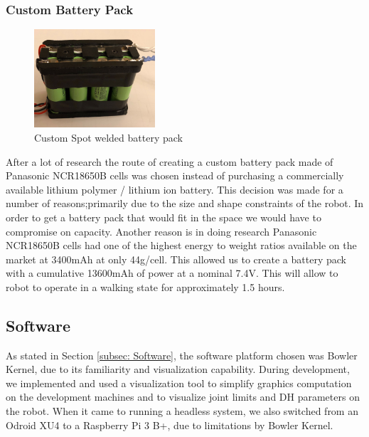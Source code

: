 \subsubsection{Custom Battery Pack}
\begin{figure}[H]
       \centering
       \includegraphics[width=0.4\textwidth]{figures/CustomBatteryPack.jpg}
       \caption{Custom Spot welded battery pack}
       \label{fig:CustomBatteryPack}
   \end{figure}
   After a lot of research the route of creating a custom battery pack made of Panasonic NCR18650B cells was chosen instead of purchasing a commercially available lithium polymer / lithium ion battery. This decision was made for a number of reasons;primarily due to the size and shape constraints of the robot. In order to get a battery pack that would fit in the space we would have to compromise on capacity. Another reason is in doing research Panasonic NCR18650B cells had one of the highest energy to weight ratios available on the market at 3400mAh at only 44g/cell. This allowed us to create a battery pack with a cumulative 13600mAh of power at a nominal 7.4V. This will allow to robot to operate in a walking state for approximately 1.5 hours.

\subsection{Software}
    As stated in Section \ref{subsec: Software}, the software platform chosen was Bowler Kernel, due to its familiarity and visualization capability. During development, we implemented and used a visualization tool to simplify graphics computation on the development machines and to visualize joint limits and DH parameters on the robot. When it came to running a headless system, we also switched from an Odroid XU4 to a Raspberry Pi 3 B+, due to limitations by Bowler Kernel. 
    
